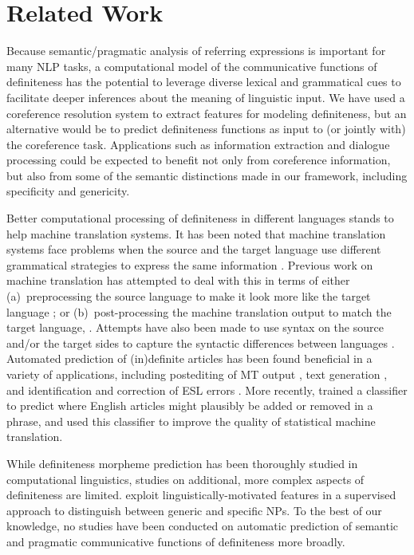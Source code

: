 \documentclass[11pt,letterpaper]{article}
\newcommand{\ensuretext}[1]{#1}
\newcommand{\ytmarker}{\ensuretext{\textcolor{blue}{\ensuremath{^{\textsc{Y}}_{\textsc{T}}}}}}
\newcommand{\arkcomment}[3]{\ensuretext{\textcolor{#3}{[#1 #2]}}}
\newcommand{\yt}[1]{\arkcomment{\ytmarker}{#1}{blue}}
\newcommand{\finalversion}[1]{}
\begin{document}
\section{Related Work}\label{sec:related}

Because semantic\slash pragmatic analysis of referring expressions is important for many NLP tasks,  
a computational model of the communicative functions of definiteness has the potential to leverage 
diverse lexical and grammatical cues to facilitate deeper inferences about the meaning of linguistic input.
We have used a coreference resolution system to extract features for modeling definiteness, but 
an alternative would be to predict definiteness functions as input to (or jointly with) the coreference task. 
Applications such as information extraction and dialogue processing could be expected to benefit not only from 
coreference information, but also from some of the semantic distinctions made in our framework, including specificity and genericity.

Better computational processing of definiteness in different languages stands to help machine translation systems. 
It has been noted that machine translation systems face problems when the source and the target language 
use different grammatical strategies to express the same information \citep{stymne09,tsvetkov13}. 
Previous work on machine translation has attempted to deal with this in terms of either 
(a)~preprocessing the source language to make it look more like the target language \citep[\textit{inter alia}]{collins05,habash07,niessen00,stymne09}; 
or (b)~post-processing the machine translation output to match the target language, \cite[e.g.,][]{popovic06}. 
Attempts have also been made to use syntax on the source and\slash or the target sides 
to capture the syntactic differences between languages \citep{liu06,yamada02,zhang07}. 
Automated prediction of (in)definite articles has been found beneficial in a variety of applications, 
including postediting of MT output \citep{knight1994automated}, text generation \citep{DBLP:conf/aaai/Elhadad93,minnen2000memory}, 
and identification and correction of ESL errors \citep{aehan2006detecting,de2008classifier,gamon2008,rozovskaya2010training}. 
More recently, \citet{tsvetkov13} trained a classifier to predict where English articles might plausibly be added or removed in a phrase, 
and used this classifier to improve the quality of statistical machine translation. 

While definiteness morpheme prediction has been thoroughly studied in computational linguistics, 
studies on additional, more complex aspects of definiteness are limited.  
\citet{reiter10}  exploit linguistically-motivated features in a supervised approach to 
distinguish between generic and specific NPs.\finalversion{\yt{what else?}}
To the best of our knowledge, no studies have been conducted 
on automatic prediction of semantic and pragmatic communicative functions of definiteness more broadly. 
\end{document}
